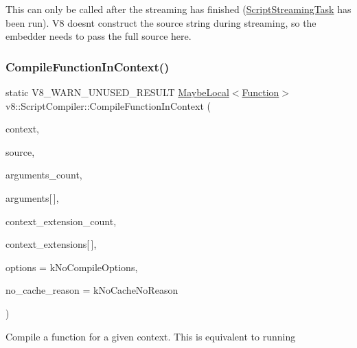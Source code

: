 This can only be called after the streaming has finished (\mbox{\hyperlink{classv8_1_1ScriptCompiler_1_1ScriptStreamingTask}{Script\+Streaming\+Task}} has been run). V8 doesn\textquotesingle{}t construct the source string during streaming, so the embedder needs to pass the full source here. \mbox{\label{classv8_1_1ScriptCompiler_ad3e6937d7ea91ac92d22a3f48844fb57}} 
\subsubsection{\texorpdfstring{Compile\+Function\+In\+Context()}{CompileFunctionInContext()}}
{\footnotesize\ttfamily static V8\+\_\+\+W\+A\+R\+N\+\_\+\+U\+N\+U\+S\+E\+D\+\_\+\+R\+E\+S\+U\+LT \mbox{\hyperlink{classv8_1_1MaybeLocal}{Maybe\+Local}}$<$\mbox{\hyperlink{classv8_1_1Function}{Function}}$>$ v8\+::\+Script\+Compiler\+::\+Compile\+Function\+In\+Context (\begin{DoxyParamCaption}\item[{\mbox{\hyperlink{classv8_1_1Local}{Local}}$<$ Context $>$}]{context,  }\item[{\mbox{\hyperlink{classv8_1_1ScriptCompiler_1_1Source}{Source}} $\ast$}]{source,  }\item[{size\+\_\+t}]{arguments\+\_\+count,  }\item[{\mbox{\hyperlink{classv8_1_1Local}{Local}}$<$ \mbox{\hyperlink{classv8_1_1String}{String}} $>$}]{arguments\mbox{[}$\,$\mbox{]},  }\item[{size\+\_\+t}]{context\+\_\+extension\+\_\+count,  }\item[{\mbox{\hyperlink{classv8_1_1Local}{Local}}$<$ \mbox{\hyperlink{classv8_1_1Object}{Object}} $>$}]{context\+\_\+extensions\mbox{[}$\,$\mbox{]},  }\item[{Compile\+Options}]{options = {\ttfamily kNoCompileOptions},  }\item[{\mbox{\hyperlink{classv8_1_1ScriptCompiler_a7f13fa15484cfc500ae51927756e0d60}{No\+Cache\+Reason}}}]{no\+\_\+cache\+\_\+reason = {\ttfamily kNoCacheNoReason} }\end{DoxyParamCaption})\hspace{0.3cm}{\ttfamily [static]}}

Compile a function for a given context. This is equivalent to running

